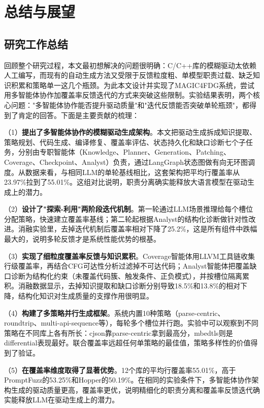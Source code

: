 \chapter{总结与展望}

\section{研究工作总结}

回顾整个研究过程，本文最初想解决的问题很明确：C/C++库的模糊驱动太依赖人工编写，而现有的自动生成方法又受限于反馈粒度粗、单模型职责过载、缺乏知识积累和策略单一这几个瓶颈。为此本文设计并实现了MAGIC4FDG系统，尝试用多智能体协作加覆盖率反馈迭代的方式来突破这些限制。实验结果表明，两个核心问题："多智能体协作能否提升驱动质量"和"迭代反馈能否突破单轮瓶颈"，都得到了肯定的回答。下面是主要贡献的梳理：

（1）\textbf{提出了多智能体协作的模糊驱动生成架构}。本文把驱动生成拆成知识提取、策略规划、代码生成、编译修复、覆盖率评估、状态持久化和缺口诊断七个子任务，分别由专职智能体（Knowledge、Planner、Generation、Patching、Coverage、Checkpoint、Analyst）负责，通过LangGraph状态图做有向无环图调度。从数据来看，与相同LLM的单轮基线相比，这套架构把平均行覆盖率从23.97\%拉到了55.01\%。这组对比说明，职责分离确实能释放大语言模型在驱动生成上的潜力。

（2）\textbf{设计了"探索-利用"两阶段迭代机制}。第一轮通过LLM场景推理给每个槽位分配策略，快速建立覆盖率基线；第二轮起根据Analyst的结构化诊断做针对性改进。消融实验里，去掉迭代机制后覆盖率相对下降了25.2\%，这是所有组件中跌幅最大的，说明多轮反馈才是系统性能优势的根基。

（3）\textbf{实现了细粒度覆盖率反馈与知识累积}。Coverage智能体用LLVM工具链收集行级覆盖率，再结合CFG可达性分析过滤掉不可达代码；Analyst智能体把覆盖缺口诊断为结构化约束（未覆盖代码簇、触发条件、正负模式），并按槽位隔离累积。消融数据显示，去掉知识提取和缺口诊断分别导致18.5\%和13.8\%的相对下降，结构化知识对生成质量的支撑作用很明显。

（4）\textbf{构建了多策略并行生成框架}。系统内置10种策略（parse-centric、roundtrip、multi-api-sequence等），每轮多个槽位并行跑。实验中可以观察到不同策略在不同库上各有所长：cjson靠parse-centric拿到最高分，mbedtls则是differential表现最好。联合覆盖率远超任何单策略的最佳值，策略多样性的价值得到了验证。

（5）\textbf{在覆盖率维度取得了显著优势}。12个库的平均行覆盖率55.01\%，高于PromptFuzz\cite{lyu2024}的53.25\%和Hopper\cite{yu2024}的50.19\%。在相同的实验条件下，多智能体协作架构生成的驱动质量更高，覆盖率更优，说明精细化的职责分离和覆盖率反馈迭代确实能释放LLM在驱动生成上的潜力。

